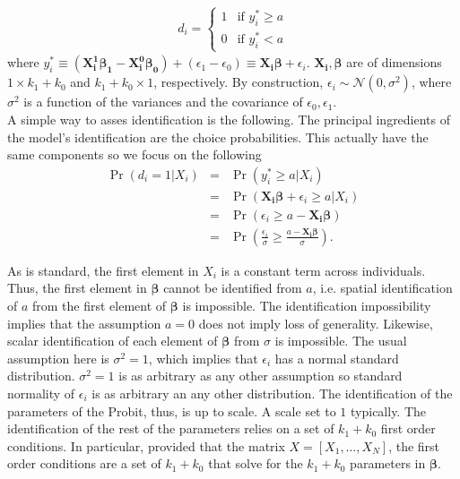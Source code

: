 \begin{exercise}
\begin{eqnarray}
d_{i} =
\begin{cases}
1 & \text{if } y_{i}^{*} \geq a  \\
0 & \text{if } y_{i}^{*} < a
\end{cases}
\end{eqnarray}
\noindent where  $y_{i}^{*} \equiv  (\mathbf{X_{i}^1 \beta_{1}} - \mathbf{X_{i}^0 \beta_{0}}) + (\epsilon_{1} - \epsilon_{0}) \equiv \mathbf{X_{i} \beta} + \epsilon_{i}$. $\mathbf{X_{i}}, \mathbf{\beta}$ are of dimensions $1 \times k_{1}+k_{0}$ and $k_{1}+k_{0} \times 1$, respectively. By construction, $\epsilon_{i} \sim \mathcal{N} (0, \sigma^2)$, where $\sigma^2$ is a function of the variances and the covariance of $\epsilon_{0}, \epsilon_{1}$.\\
\indent A simple way to asses identification is the following. The principal ingredients of the model's identification are the choice probabilities. This actually have the same components so we focus on the following
\begin{eqnarray}
\Pr\left(d_{i} = 1 | X_{i}\right) &=& \Pr\left(y_{i}^{*} \geq a |X_{i}\right) \\ \nonumber
&=& \Pr\left(\mathbf{X_{i} \beta} + \epsilon_{i} \geq a |X_{i}\right) \\ \nonumber
&=& \Pr\left(\epsilon_{i} \geq a - \mathbf{X_{i} \beta} \right) \\ \nonumber
&=& \Pr \left( \frac{\epsilon_{i}}{\sigma} \geq \frac{a - \mathbf{X_{i} \beta}}{\sigma} \right).
\end{eqnarray}
\end{exercise}
\noindent As is standard, the first element in $X_{i}$ is a constant term across individuals. Thus, the first element in $\mathbf{\beta}$ cannot be identified from $a$, i.e. spatial identification of $a$ from the first element of $\mathbf{\beta}$ is impossible. The identification impossibility implies that the assumption $a = 0$ does not imply loss of generality. Likewise, scalar identification of each element of  $\mathbf{\beta}$ from $\sigma$ is impossible. The usual assumption here is $\sigma^2 = 1$, which implies that $\epsilon_{i}$ has a normal standard distribution. $\sigma^2 = 1$ is as arbitrary as any other assumption so standard normality of $\epsilon_{i}$ is as arbitrary an any other distribution. The identification of the parameters of the Probit, thus, is up to scale. A scale set to $1$ typically. The identification of the rest of the parameters relies on a set of $k_{1} + k_{0}$ first order conditions. In particular, provided that the matrix $X = [ X_{1}, \ldots, X_{N}]$, the first order conditions are a set of $k_{1} + k_{0}$ that solve for the $k_{1} + k_{0}$ parameters in $\mathbf{\beta}$. 

